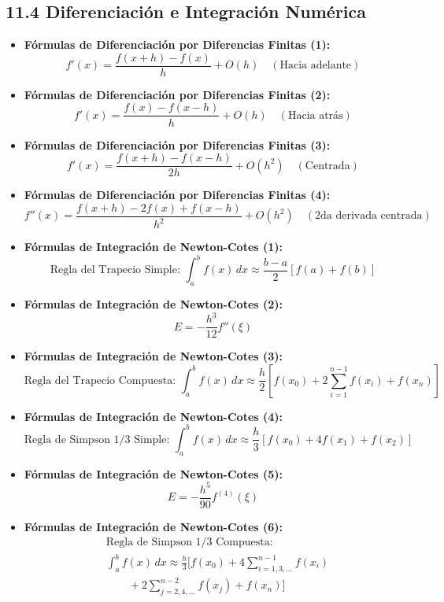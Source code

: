 \documentclass[11pt,a4paper]{article}
\begin{document}
\subsection*{11.4 Diferenciación e Integración Numérica}

\begin{itemize}
  \item \textbf{Fórmulas de Diferenciación por Diferencias Finitas (1):}
  \[
    f'(x) = \frac{f(x + h) - f(x)}{h} + O(h) \quad (\text{Hacia adelante})
  \]
  \item \textbf{Fórmulas de Diferenciación por Diferencias Finitas (2):}
  \[
    f'(x) = \frac{f(x) - f(x - h)}{h} + O(h) \quad (\text{Hacia atrás})
  \]
  \item \textbf{Fórmulas de Diferenciación por Diferencias Finitas (3):}
  \[
    f'(x) = \frac{f(x + h) - f(x - h)}{2h} + O(h^2) \quad (\text{Centrada})
  \]
  \item \textbf{Fórmulas de Diferenciación por Diferencias Finitas (4):}
  \[
    f''(x) = \frac{f(x + h) - 2f(x) + f(x - h)}{h^2} + O(h^2) \quad (\text{2da derivada centrada})
  \]
  \item \textbf{Fórmulas de Integración de Newton-Cotes (1):}
  \[
    \text{Regla del Trapecio Simple: } \int_a^b f(x) \, dx \approx \frac{b - a}{2}[f(a) + f(b)]
  \]
  \item \textbf{Fórmulas de Integración de Newton-Cotes (2):}
  \[
    E = -\frac{h^3}{12}f''(\xi)
  \]
  \item \textbf{Fórmulas de Integración de Newton-Cotes (3):}
  \[
    \text{Regla del Trapecio Compuesta: } \int_a^b f(x) \, dx \approx \frac{h}{2}\left[ f(x_0) + 2\sum_{i=1}^{n-1} f(x_i) + f(x_n) \right]
  \]
  \item \textbf{Fórmulas de Integración de Newton-Cotes (4):}
  \[
    \text{Regla de Simpson } 1/3 \text{ Simple: } \int_a^b f(x) \, dx \approx \frac{h}{3}[f(x_0) + 4f(x_1) + f(x_2)]
  \]
  \item \textbf{Fórmulas de Integración de Newton-Cotes (5):}
  \[
    E = -\frac{h^5}{90}f^{(4)}(\xi)
  \]
  \item \textbf{Fórmulas de Integración de Newton-Cotes (6):}
  \[
    \begin{aligned}
      &\text{Regla de Simpson } 1/3 \text{ Compuesta:} \\
      &\int_a^b f(x) \, dx \approx \frac{h}{3}[f(x_0) + 4\sum_{i=1,3,\dots}^{n-1} f(x_i) \\
      &\qquad + 2\sum_{j=2,4,\dots}^{n-2} f(x_j) + f(x_n)]

\end{aligned}\]
\end{itemize}
\end{document}
